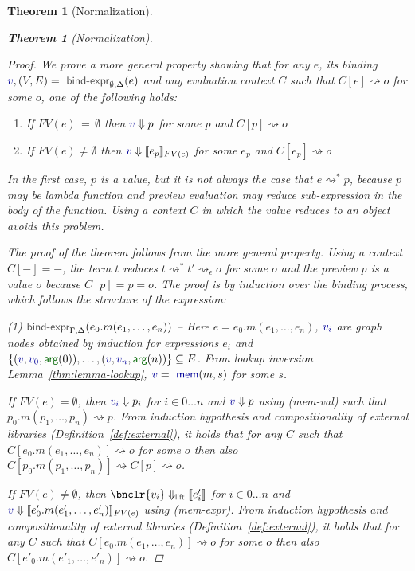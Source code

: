 \documentclass[acmsmall,anonymous,fleqn]{acmart}\settopmatter{printfolios=false,printccs=false,printacmref=false}
\newcounter{thc}
\theoremstyle{plain}
\newtheorem{theorem}[thc]{Theorem}
\theoremstyle{definition}
\newcommand{\ident}[1]{\textnormal{\textcolor{idclr}{\sffamily #1}}}
\newcommand{\bndclr}[1]{\textcolor{kvdclr}{#1}}
\newcommand{\bnd}[1]{\textnormal{\textcolor{kvdclr}{\sffamily #1}}}
\newcommand{\blbl}[1]{\textnormal{\textcolor{numclr}{\sffamily #1}}}
\newcommand{\rname}[1]{{\sffamily\small(#1)}}
\begin{document}
\begin{theorem}[Normalization]
\begin{theorem}[Normalization]
\begin{proof}
We prove a more general property showing that for any $e$, its binding
$\bndclr{v}, (V, E) = \ident{bind-expr}_{\emptyset, \Delta}(e)$ and any evaluation context $C$
such that $C[e]\rightsquigarrow o$ for some $o$, one of the following holds:
%
\begin{enumerate}
\item[a.] If $FV(e)\,=\,\emptyset$ then $\bndclr{v} \Downarrow p$ for some $p$ and $C[p] \rightsquigarrow o$
\item[b.] If $FV(e)\neq\emptyset$ then $\bndclr{v} \Downarrow \llbracket e_p \rrbracket_{FV(e)}$ for some $e_p$ and $C[e_p] \rightsquigarrow o$
\end{enumerate}
%
In the first case, $p$ is a value, but it is not always the case that $e \rightsquigarrow^{*} p$,
because $p$ may be lambda function and preview evaluation may reduce sub-expression in the body of
the function. Using a context $C$ in which the value reduces to an object avoids this problem.

The proof of the theorem follows from the more general property. Using a context $C[-]=-$, the
term $t$ reduces $t \rightsquigarrow^{*}t' \rightsquigarrow_\epsilon o$ for some $o$ and the
preview $p$ is a value $o$ because $C[p] = p = o$.
The proof is by induction over the binding process, which follows the structure of the expression:

\vspace{0.75em}\noindent(1) $\ident{bind-expr}_{\Gamma, \Delta}(e_0.m(e_1, \ldots, e_n))$ --
  Here $e = e_0.m(e_1, \ldots, e_n)$, $\bndclr{v_i}$ are graph nodes obtained by induction for
  expressions $e_i$ and $\{ (\bndclr{v}, \bndclr{v_0}, \blbl{arg}(0)), \ldots, (\bndclr{v}, \bndclr{v_n}, \blbl{arg}(n))\} \subseteq E$.
  From lookup inversion Lemma~\ref{thm:lemma-lookup}, $\bndclr{v} = \bnd{mem}(m, s)$ for some $s$.

  If $FV(e)=\emptyset$, then $\bndclr{v_i} \Downarrow p_i$ for $i\in 0\ldots n$ and
  $\bndclr{v}\Downarrow p$ using \rname{mem-val} such that $p_0.m(p_1, \ldots, p_n) \rightsquigarrow p$.
  From induction hypothesis and \emph{compositionality} of external libraries (Definition~\ref{def:external}),
  it holds that for any $C$ such that $C[e_0.m(e_1, \ldots, e_n)] \rightsquigarrow o$ for some $o$
  then also $C[p_0.m(p_1, \ldots, p_n)] \rightsquigarrow C[p] \rightsquigarrow o$.

  If $FV(e)\neq\emptyset$, then $\bnclr{v_i} \Downarrow_\ident{lift} \llbracket e'_i \rrbracket$ for $i\in 0\ldots n$ and
  $\bndclr{v}\Downarrow \llbracket e'_0.m(e'_1, \ldots, e'_n) \rrbracket_{FV(e)}$ using \rname{mem-expr}.
  From induction hypothesis and \emph{compositionality} of external libraries (Definition~\ref{def:external}),
  it holds that for any $C$ such that $C[e_0.m(e_1, \ldots, e_n)] \rightsquigarrow o$ for some $o$
  then also $C[e'_0.m(e'_1, \ldots, e'_n)] \rightsquigarrow o$.


\end{proof}
\end{theorem}
\end{theorem}
\end{document}
